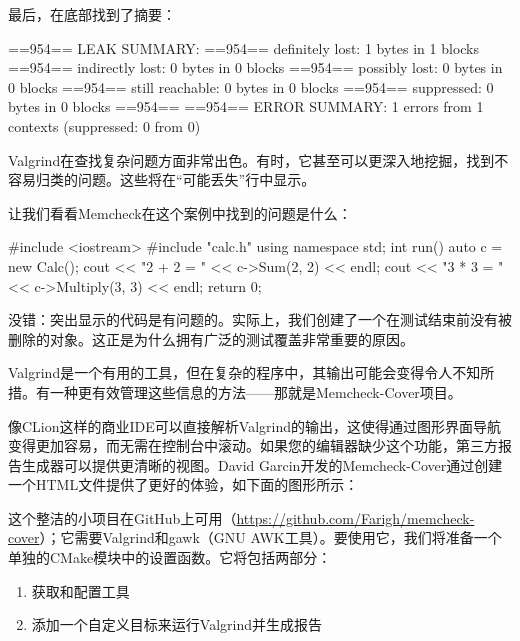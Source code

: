 最后，在底部找到了摘要：

\begin{shell}
==954== LEAK SUMMARY:
==954==    definitely lost: 1 bytes in 1 blocks
==954==    indirectly lost: 0 bytes in 0 blocks
==954==      possibly lost: 0 bytes in 0 blocks
==954==    still reachable: 0 bytes in 0 blocks
==954==         suppressed: 0 bytes in 0 blocks
==954==
==954== ERROR SUMMARY: 1 errors from 1 contexts (suppressed: 0 from 0)
\end{shell}

Valgrind在查找复杂问题方面非常出色。有时，它甚至可以更深入地挖掘，找到不容易归类的问题。这些将在“可能丢失”行中显示。

让我们看看Memcheck在这个案例中找到的问题是什么：


\begin{cpp}
#include <iostream>
#include "calc.h"
using namespace std;
int run() {
    auto c = new Calc();
    cout << "2 + 2 = " << c->Sum(2, 2) << endl;
    cout << "3 * 3 = " << c->Multiply(3, 3) << endl;
    return 0;
}
\end{cpp}

没错：突出显示的代码是有问题的。实际上，我们创建了一个在测试结束前没有被删除的对象。这正是为什么拥有广泛的测试覆盖非常重要的原因。

Valgrind是一个有用的工具，但在复杂的程序中，其输出可能会变得令人不知所措。有一种更有效管理这些信息的方法——那就是Memcheck-Cover项目。


像CLion这样的商业IDE可以直接解析Valgrind的输出，这使得通过图形界面导航变得更加容易，而无需在控制台中滚动。如果您的编辑器缺少这个功能，第三方报告生成器可以提供更清晰的视图。David Garcin开发的Memcheck-Cover通过创建一个HTML文件提供了更好的体验，如下面的图形所示：


这个整洁的小项目在GitHub上可用（\url{https://github.com/Farigh/memcheck-cover}）；它需要Valgrind和gawk（GNU AWK工具）。要使用它，我们将准备一个单独的CMake模块中的设置函数。它将包括两部分：

\begin{enumerate}
\item
获取和配置工具

\item
添加一个自定义目标来运行Valgrind并生成报告
\end{enumerate}

